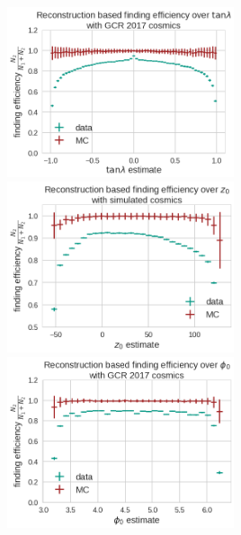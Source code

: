 \documentclass[18pt]{beamer}
\begin{document}
  \begin{frame}
    \begin{center}
      \includegraphics[width=0.5\textwidth]{figures/findeff_tan_lambda_data_mc.png}
      \includegraphics[width=0.5\textwidth]{figures/findeff_z0_data_mc.png}\\
      \includegraphics[width=0.5\textwidth]{figures/findeff_phi0_data_mc.png}
    \end{center}
  \end{frame}
  
\end{document}
